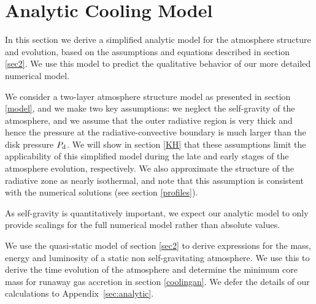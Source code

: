 \documentclass[apj]{emulateapj}
\newcommand{\App}[1]{Appendix~\ref{#1}}
\newcommand{\di}{_{\rm d}}
\begin{document}
\section{Analytic Cooling Model}
\label{analytic}

In this section we derive a simplified analytic model for the atmosphere structure and evolution, based on the assumptions and equations described in section \ref{sec2}. We use this model to predict the qualitative behavior of our more detailed numerical model. %

We consider a two-layer atmosphere structure model as presented in section \ref{model}, and we make two key assumptions: we neglect the self-gravity of the atmosphere, and we assume that the outer radiative region is very thick and hence the pressure at the radiative-convective boundary is much larger than the disk pressure $P\di$. We will show in section \ref{KH} that these assumptions limit the applicability of this simplified model during the late and early stages of the atmosphere evolution, respectively. We also approximate the structure of the radiative zone as nearly isothermal, and note that this assumption is consistent with the numerical solutions (see section \ref{profiles}). 

As self-gravity is quantitatively important, we expect our analytic model to only provide scalings for the full numerical model rather than absolute values.



We use the quasi-static model of section \ref{sec2} to derive expressions for the mass, energy and luminosity of a static non self-gravitating atmosphere. We use this to derive the time evolution of the atmosphere and determine the minimum core mass for runaway gas accretion in section \ref{coolingan}. We defer the details of our calculations to \App{sec:analytic}.


\end{document}
